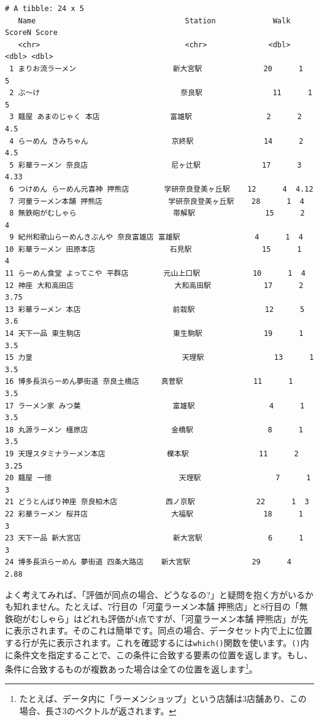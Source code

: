 \documentclass[
  a4paper,
  pandoc,
  ja=standard,
  jafont=haranoaji]{bxjsbook}
\begin{document}
\begin{verbatim}
# A tibble: 24 x 5
   Name                                  Station             Walk ScoreN Score
   <chr>                                 <chr>              <dbl>  <dbl> <dbl>
 1 まりお流ラーメン                      新大宮駅              20      1  5   
 2 ぶ～け                                奈良駅                11      1  5   
 3 麺屋 あまのじゃく 本店                富雄駅                 2      2  4.5 
 4 らーめん きみちゃん                   京終駅                14      2  4.5 
 5 彩華ラーメン 奈良店                   尼ヶ辻駅              17      3  4.33
 6 つけめん らーめん元喜神 押熊店        学研奈良登美ヶ丘駅    12      4  4.12
 7 河童ラーメン本舗 押熊店               学研奈良登美ヶ丘駅    28      1  4   
 8 無鉄砲がむしゃら                      帯解駅                15      2  4   
 9 紀州和歌山らーめんきぶんや 奈良富雄店 富雄駅                 4      1  4   
10 彩華ラーメン 田原本店                 石見駅                15      1  4   
11 らーめん食堂 よってこや 平群店        元山上口駅            10      1  4   
12 神座 大和高田店                       大和高田駅            17      2  3.75
13 彩華ラーメン 本店                     前栽駅                12      5  3.6 
14 天下一品 東生駒店                     東生駒駅              19      1  3.5 
15 力皇                                  天理駅                13      1  3.5 
16 博多長浜らーめん夢街道 奈良土橋店     真菅駅                11      1  3.5 
17 ラーメン家 みつ葉                     富雄駅                 4      1  3.5 
18 丸源ラーメン 橿原店                   金橋駅                 8      1  3.5 
19 天理スタミナラーメン本店              櫟本駅                11      2  3.25
20 麺屋 一徳                             天理駅                 7      1  3   
21 どうとんぼり神座 奈良柏木店           西ノ京駅              22      1  3   
22 彩華ラーメン 桜井店                   大福駅                18      1  3   
23 天下一品 新大宮店                     新大宮駅               6      1  3   
24 博多長浜らーめん 夢街道 四条大路店    新大宮駅              29      4  2.88
\end{verbatim}

よく考えてみれば、「評価が同点の場合、どうなるの?」と疑問を抱く方がいるかも知れません。たとえば、7行目の「河童ラーメン本舗
押熊店」と8行目の「無鉄砲がむしゃら」はどれも評価が4点ですが、「河童ラーメン本舗
押熊店」が先に表示されます。そのこれは簡単です。同点の場合、データセット内で上に位置する行が先に表示されます。これを確認するには\texttt{which()}関数を使います。\texttt{()}内に条件文を指定することで、この条件に合致する要素の位置を返します。もし、条件に合致するものが複数あった場合は全ての位置を返します\footnote{たとえば、データ内に「ラーメンショップ」という店舗は3店舗あり、この場合、長さ3のベクトルが返されます。}。
\end{document}

